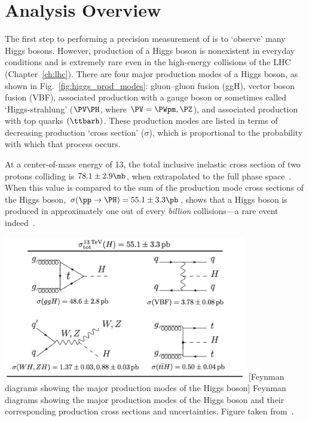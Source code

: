 \section{Analysis Overview}
\label{sec:analysis_overview}
The first step to performing a precision measurement of \mH is to `observe' many Higgs bosons.
However, production of a Higgs boson is nonexistent in everyday conditions and is extremely rare even in the high-energy \pp collisions of the LHC (Chapter~\ref{ch:lhc}).
There are four major production modes of a Higgs boson, as shown in Fig.~\ref{fig:higgs_prod_modes}:
gluon--gluon fusion (ggH),
vector boson fusion (VBF),
associated production with a gauge boson or sometimes called `Higgs-strahlung' ($\PV \PH$, where $\PV = \PWpm, \PZ$),
and associated production with top quarks $\left( \ttbarh \right)$.
These production modes are listed in terms of decreasing production `cross section' ($\sigma$), which is proportional to the probability with which that process occurs.

At a center-of-mass energy of 13\TeV, the total inclusive inelastic cross section of two protons colliding is $78.1 \pm 2.9\mb$, when extrapolated to the full phase space~\cite{ATLAS:2016ygv}.
When this value is compared to the sum of the production mode cross sections of the Higgs boson, $\sigma(\pp \to \PH) = 55.1 \pm 3.3\pb$, shows that a Higgs boson is produced in approximately one out of every \emph{billion} \pp collisions---a rare event indeed~\cite{new_pdg_2022}.
\begin{multiFigure}
	\centering
		\includegraphics[width=0.8\textwidth]{figures/higgsmassmeas/higgs_prod_modes.png}
		[Feynman diagrams showing the major production modes of the Higgs boson]
		{Feynman diagrams showing the major production modes of the Higgs boson and their corresponding production cross sections and uncertainties.
		Figure taken from~\cite{new_pdg_2022}.}
	\label{fig:higgs_prod_modes}
\end{multiFigure} 

